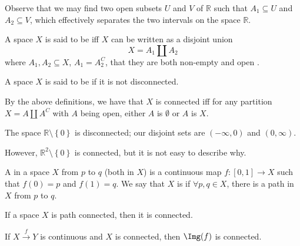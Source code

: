 \documentclass[notoc,notitlepage]{tufte-book}
\begin{document}
Observe that we may find two open subsets $U$ and $V$ of $\mathbb{R}$ such that $A_1 \subseteq U$
and $A_2 \subseteq V$, which effectively separates the two intervals on the space $\mathbb{R}$.

\begin{defn}[Disconnectedness]\label{defn:disconnectedness}
  A space $X$ is said to be  iff $X$ can be written as a
  disjoint union
  \begin{equation*}
    X = A_1 \coprod A_2
  \end{equation*}
  where $A_1, A_2 \subseteq X$, $A_1 = A_2^C$, that they are both non-empty and open
  .
\end{defn}

\begin{defn}[Connctedness]\label{defn:connctedness}
  A space $X$ is said to be  if it is not disconnected.
\end{defn}

\begin{note}
  By the above definitions, we have that $X$ is connected iff for any partition
  $X = A \coprod A^C$ with $A$ being open, either $A$ is $\emptyset$ or $A$ is $X$.
\end{note}

\begin{eg}
  The space $\mathbb{R} \setminus \left\{ 0 \right\}$ is disconnected; our disjoint sets
  are $(-\infty, 0)$ and $(0, \infty)$.
\end{eg}

However, $\mathbb{R}^2 \setminus \left\{ 0 \right\}$ is connected, but it is not easy to
describe why.

\begin{defn}[Path]\label{defn:path}
  A  in a space $X$ from $p$ to $q$ (both in $X$) is a continuous map
  $f : [0, 1] \to X$ such that $f(0) = p$ and $f(1) = q$. We say that $X$ is
   if $\forall p, q \in X$, there is a path in $X$ from $p$
  to $q$.
\end{defn}

\begin{lemma}\label{lemma:path_connectedness_implies_connectedness}
  If a space $X$ is path connected, then it is connected.
\end{lemma}

\begin{thm}\label{thm:from_connected_space_to_connected_space}
  If $X \overset{f}{\to} Y$ is continuous and $X$ is connected, then
  $\Img(f)$ is connected.
\end{thm}
\end{document}
